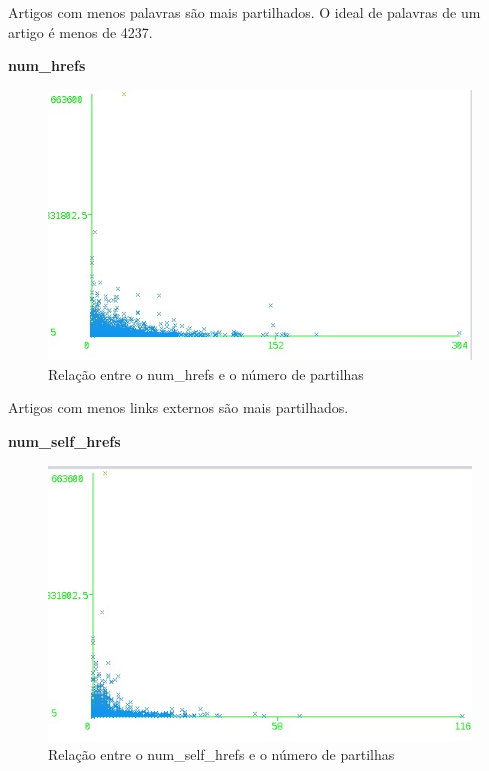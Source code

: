 Artigos com menos palavras são mais partilhados. O ideal de palavras de um artigo é menos de 4237.

\textbf{num\_hrefs}

\begin{figure}[H]
    \centering
    \includegraphics[scale=0.6]{tex/img/graph3.jpg}
    \caption{Relação entre o num\_hrefs e o número de partilhas}
    \label{fig:numHrefst}
\end{figure}

Artigos com menos links externos são mais partilhados.

\textbf{num\_self\_hrefs}

\begin{figure}[H]
    \centering
    \includegraphics[scale=0.6]{tex/img/graph4.jpg}
    \caption{Relação entre o num\_self\_hrefs e o número de partilhas}
    \label{fig:numSelfHrefst}
\end{figure}


